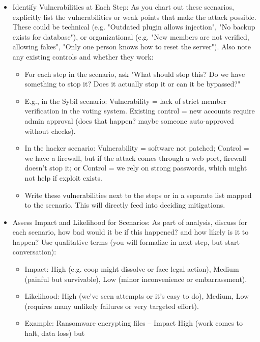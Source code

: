 \begin{itemize}
    \item Identify Vulnerabilities at Each Step: As you chart out these scenarios, explicitly list the
    vulnerabilities or weak points that make the attack possible. These could be technical (e.g.
    "Outdated plugin allows injection", "No backup exists for database"), or organizational (e.g. "New
    members are not verified, allowing fakes", "Only one person knows how to reset the server"). Also
    note any existing controls and whether they work:
        \begin{itemize}   
            \item For each step in the scenario, ask "What should stop this? Do we have something to
            stop it? Does it actually stop it or can it be bypassed?"
            \item E.g., in the Sybil scenario: Vulnerability = lack of strict member verification in the
            voting system. Existing control = new accounts require admin approval (does that happen? maybe
            someone auto-approved without checks).
            \item In the hacker scenario: Vulnerability = software not patched; Control = we have a
            firewall, but if the attack comes through a web port, firewall doesn't stop it; or Control = we rely
            on strong passwords, which might not help if exploit exists.
            \item Write these vulnerabilities next to the steps or in a separate list mapped to the
            scenario. This will directly feed into deciding mitigations.
        \end{itemize}
    \item Assess Impact and Likelihood for Scenarios: As part of analysis, discuss for each scenario,
    how bad would it be if this happened? and how likely is it to happen? Use qualitative terms (you
    will formalize in next step, but start conversation):
        \begin{itemize}   
            \item Impact: High (e.g. coop might dissolve or face legal action), Medium (painful but
            survivable), Low (minor inconvenience or embarrassment).
            \item Likelihood: High (we've seen attempts or it's easy to do), Medium, Low (requires many
            unlikely failures or very targeted effort).
            \item Example: Ransomware encrypting files – Impact High (work comes to halt, data loss) but

\end{itemize}
\end{itemize}
